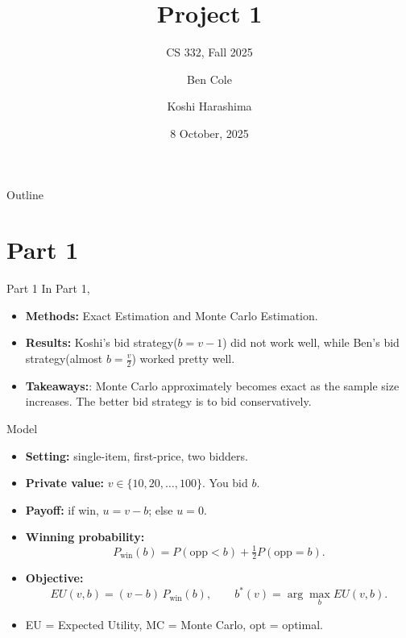 \documentclass{beamer}
\title[Project 1]{Project 1}
\subtitle{CS 332, Fall 2025}
\author{Ben Cole \and Koshi Harashima}
\date{8 October, 2025}
\begin{document}
\maketitle

\begin{frame}{Outline}
  \tableofcontents
\end{frame}


\section{Part 1}

\begin{frame}{Part 1}
In Part 1, 
\medskip
\begin{itemize}
  \item \textbf{Methods:} Exact Estimation and Monte Carlo Estimation.
  \item \textbf{Results:} Koshi's bid strategy($b=v-1$) did not work well, while Ben's bid strategy(almost $b = \frac{v}{2}$) worked pretty well.
  \item \textbf{Takeaways:}: Monte Carlo approximately becomes exact as the sample size increases. The better bid strategy is to bid conservatively.
\end{itemize}
\end{frame}


\begin{frame}{Model}
\medskip
\begin{itemize}
  \item \textbf{Setting:} single-item, first-price, two bidders.
  \item \textbf{Private value:} $v\in\{10,20,\dots,100\}$. You bid $b$.
  \item \textbf{Payoff:} if win, $u=v-b$; else $u=0$.
  \item \textbf{Winning probability:}
    \[
      P_{\text{win}}(b)=P(\text{opp}<b)+\tfrac12P(\text{opp}=b).
    \]
  \item \textbf{Objective:}
    \[
      EU(v,b)=(v-b)\,P_{\text{win}}(b),\qquad b^*(v)=\arg\max_{b}EU(v,b).
    \]
  \item EU = Expected Utility,\; MC = Monte Carlo,\; opt = optimal.
\end{itemize}
\end{frame}
\end{document}
